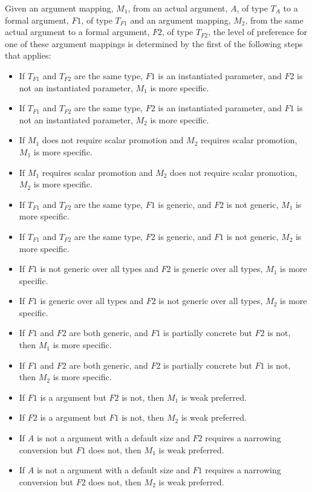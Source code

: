 Given an argument mapping, $M_1$, from an actual argument, $A$, of
type $T_A$ to a formal argument, $F1$, of type $T_{F1}$ and an
argument mapping, $M_2$, from the same actual argument to a formal
argument, $F2$, of type $T_{F2}$, the level of preference for one of
these argument mappings is determined by the first of the following steps
that applies:
\begin{itemize}
\item
 If $T_{F1}$ and $T_{F2}$ are the same type, $F1$ is an instantiated
 parameter, and $F2$ is not an instantiated parameter, $M_1$ is more
 specific.
\item
 If $T_{F1}$ and $T_{F2}$ are the same type, $F2$ is an instantiated
 parameter, and $F1$ is not an instantiated parameter, $M_2$ is more
 specific.
\item
 If $M_1$ does not require scalar promotion and $M_2$ requires scalar
 promotion, $M_1$ is more specific.
\item
 If $M_1$ requires scalar promotion and $M_2$ does not require scalar
 promotion, $M_2$ is more specific.
\item
 If $T_{F1}$ and $T_{F2}$ are the same type, $F1$ is generic, and $F2$
 is not generic, $M_1$ is more specific.
\item
 If $T_{F1}$ and $T_{F2}$ are the same type, $F2$ is generic, and $F1$
 is not generic, $M_2$ is more specific.
\item
 If $F1$ is not generic over all types and $F2$ is generic over all
 types, $M_1$ is more specific.
\item
 If $F1$ is generic over all types and $F2$ is not generic over all
 types, $M_2$ is more specific.
\item
 If $F1$ and $F2$ are both generic, and $F1$ is partially concrete but
 $F2$ is not, then $M_1$ is more specific.
\item
 If $F1$ and $F2$ are both generic, and $F2$ is partially concrete but
 $F1$ is not, then $M_2$ is more specific.
\item
  If $F1$ is a  argument but $F2$ is not, then $M_1$ is weak
  preferred.
\item
  If $F2$ is a  argument but $F1$ is not, then $M_2$ is weak
  preferred.
\item
  If $A$ is not a  argument with a default size and $F2$
  requires a narrowing conversion but $F1$ does not, then $M_1$ is weak
  preferred.
\item
  If $A$ is not a  argument with a default size and $F1$
  requires a narrowing conversion but $F2$ does not, then $M_2$ is weak
  preferred.


\end{itemize}
